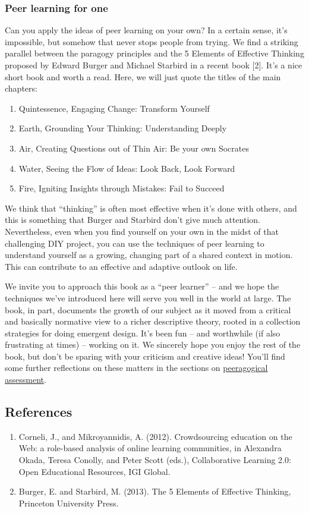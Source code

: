 \subsubsection{Peer learning for one}

Can you apply the ideas of peer learning on your own? In a certain
sense, it's impossible, but somehow that never stops people from trying.
We find a striking parallel between the paragogy principles and the 5
Elements of Effective Thinking proposed by Edward Burger and Michael
Starbird in a recent book {[}2{]}. It's a nice short book and worth a
read. Here, we will just quote the titles of the main chapters:

\begin{enumerate}
\item
  Quintessence, Engaging Change: Transform Yourself
\item
  Earth, Grounding Your Thinking: Understanding Deeply
\item
  Air, Creating Questions out of Thin Air: Be your own Socrates
\item
  Water, Seeing the Flow of Ideas: Look Back, Look Forward
\item
  Fire, Igniting Insights through Mistakes: Fail to Succeed
\end{enumerate}
We think that ``thinking'' is often most effective when it's done with
others, and this is something that Burger and Starbird don't give much
attention. Nevertheless, even when you find yourself on your own in the
midst of that challenging DIY project, you can use the techniques of
peer learning to understand yourself as a growing, changing part of a
shared context in motion. This can contribute to an effective and
adaptive outlook on life.

We invite you to approach this book as a ``peer learner'' -- and we hope
the techniques we've introduced here will serve you well in the world at
large. The book, in part, documents the growth of our subject as it
moved from a critical and basically normative view to a richer
descriptive theory, rooted in a collection strategies for doing emergent
design. It's been fun -- and worthwhile (if also frustrating at times)
-- working on it. We sincerely hope you enjoy the rest of the book, but
don't be sparing with your criticism and creative ideas! You'll find
some further reflections on these matters in the sections on
\href{http://peeragogy.org/assessment/}{peeragogical assessment}.

\subsection{References}

\begin{enumerate}
\item
  Corneli, J., and Mikroyannidis, A. (2012). Crowdsourcing education on
  the Web: a role-based analysis of online learning communities, in
  Alexandra Okada, Teresa Conolly, and Peter Scott (eds.), Collaborative
  Learning 2.0: Open Educational Resources, IGI Global.
\item
  Burger, E. and Starbird, M. (2013). The 5 Elements of Effective
  Thinking, Princeton University Press.
\end{enumerate}

